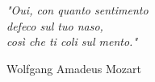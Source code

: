 \newlength\longest

\clearpage

\thispagestyle{empty}
\null\vfill

\settowidth{}
\begin{center}
    \parbox{\longest}{%
        \raggedright{\LARGE\itshape%
            "Oui, con quanto sentimento\\
            defeco sul tuo naso,\\
            così che ti coli sul mento."\par\bigskip
        }
        \raggedleft\Large{Wolfgang Amadeus Mozart}\par%
    }
\end{center}


\vfill\vfill

\clearpage
